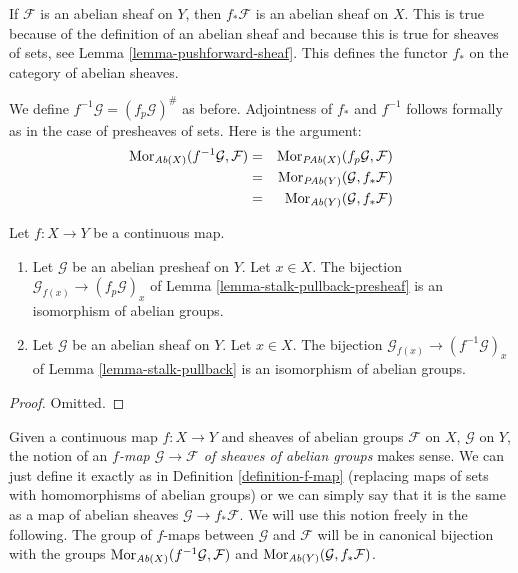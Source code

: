 \medskip\noindent
If $\mathcal{F}$ is an abelian sheaf on $Y$, then $f_*\mathcal{F}$
is an abelian sheaf on $X$. This is true because of the definition
of an abelian sheaf and because this is true for sheaves of sets,
see Lemma \ref{lemma-pushforward-sheaf}. This defines the functor
$f_*$ on the category of abelian sheaves.

\medskip\noindent
We define $f^{-1}\mathcal{G} = (f_p\mathcal{G})^\#$ as before.
Adjointness of $f_*$ and $f^{-1}$ follows formally as in
the case of presheaves of sets. Here is the argument:
\begin{eqnarray*}
\mathop{\mathrm{Mor}}\nolimits_{\textit{Ab}(X)}(f^{-1}\mathcal{G}, \mathcal{F})
& = &
\mathop{\mathrm{Mor}}\nolimits_{\textit{PAb}(X)}(f_p\mathcal{G}, \mathcal{F}) \\
& = &
\mathop{\mathrm{Mor}}\nolimits_{\textit{PAb}(Y)}(\mathcal{G}, f_*\mathcal{F}) \\
& = &
\mathop{\mathrm{Mor}}\nolimits_{\textit{Ab}(Y)}(\mathcal{G}, f_*\mathcal{F})
\end{eqnarray*}

\begin{lemma}
\label{lemma-pullback-abelian-stalk}
Let $f : X \to Y$ be a continuous map.
\begin{enumerate}
\item Let $\mathcal{G}$ be an abelian presheaf on $Y$.
Let $x \in X$. The bijection
$\mathcal{G}_{f(x)} \to (f_p\mathcal{G})_x$ of
Lemma \ref{lemma-stalk-pullback-presheaf} is an isomorphism of abelian groups.
\item Let $\mathcal{G}$ be an abelian sheaf on $Y$.
Let $x \in X$. The bijection
$\mathcal{G}_{f(x)} \to (f^{-1}\mathcal{G})_x$ of
Lemma \ref{lemma-stalk-pullback} is an isomorphism of abelian groups.
\end{enumerate}
\end{lemma}

\begin{proof}
Omitted.
\end{proof}

\noindent
Given a continuous map $f : X \to Y$ and sheaves of abelian
groups $\mathcal{F}$ on $X$, $\mathcal{G}$ on $Y$, the notion
of an {\it $f$-map $\mathcal{G} \to \mathcal{F}$
of sheaves of abelian groups} makes sense. We can just define
it exactly as in Definition \ref{definition-f-map} (replacing maps
of sets with homomorphisms of abelian groups) or we can
simply say that it is the same as a map of abelian
sheaves $\mathcal{G} \to f_*\mathcal{F}$. We will use this
notion freely in the following. The group of $f$-maps between
$\mathcal{G}$ and $\mathcal{F}$ will be in canonical bijection
with the groups
$\mathop{\mathrm{Mor}}\nolimits_{\textit{Ab}(X)}(f^{-1}\mathcal{G}, \mathcal{F})$
and
$\mathop{\mathrm{Mor}}\nolimits_{\textit{Ab}(Y)}(\mathcal{G}, f_*\mathcal{F})$.

